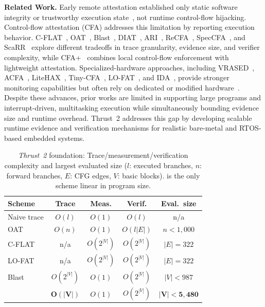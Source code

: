 \textbf{Related Work.}
Early remote attestation established only static software integrity or trustworthy execution state~\cite{seshadri2005pioneer,li2011viper,kong2014pufatt,armknecht2013security,eldefrawy2012smart}, not runtime control-flow hijacking.
Control-flow attestation (CFA) addresses this limitation by reporting execution behavior.
C-FLAT~\cite{abera2016c}, OAT~\cite{sun2020oat}, Blast~\cite{yadav2023whole}, DIAT~\cite{abera2019diat}, ARI~\cite{wangari}, ReCFA~\cite{zhang2021recfa}, SpecCFA~\cite{caulfield2024speccfa}, and ScaRR~\cite{toffalini2019scarr} explore different tradeoffs in trace granularity, evidence size, and verifier complexity, while CFA+~\cite{299850} combines local control-flow enforcement with lightweight attestation.
Specialized-hardware approaches, including VRASED~\cite{nunes2019vrased}, ACFA~\cite{caulfield2023acfa}, LiteHAX~\cite{dessouky2018litehax}, Tiny-CFA~\cite{nunes2021tiny}, LO-FAT~\cite{dessouky2017fat}, and IDA~\cite{arkannezhadida}, provide stronger monitoring capabilities but often rely on dedicated or modified hardware~\cite{neto2025pearts}.
Despite these advances, prior works are limited in supporting large programs and interrupt-driven, multitasking execution while simultaneously bounding evidence size and runtime overhead.
Thrust~2 addresses this gap by developing scalable runtime evidence and verification mechanisms for realistic bare-metal and RTOS-based embedded systems.

\begin{table}
	\centering
	\footnotesize
	\setlength{\tabcolsep}{3pt}
	\begin{tabular}{lcccc}
		\toprule
		Scheme & Trace & Meas. & Verif. & Eval.\ size \\
		\midrule
		Naive trace & $O(l)$ & $O(1)$ & $O(l)$ & n/a \\
		OAT~\cite{sun2020oat} & $O(n)$ & $O(1)$ & $O(l|E|)$ & $n{<}1{,}000$ \\
		C-FLAT~\cite{abera2016c} & n/a & $O(2^{|V|})$ & $O(2^{|V|})$ & $|E|{=}322$ \\
		LO-FAT~\cite{dessouky2017fat} & n/a & $O(2^{|V|})$ & $O(2^{|V|})$ & $|E|{=}322$ \\
		Blast~\cite{yadav2023whole} & $O(2^{|V|})$ & $O(1)$ & $O(2^{|V|})$ & $|V|{<}987$ \\
		\textbf{\enola}~\cite{armanuzzaman2026enola} & $\mathbf{O(|V|)}$ & $O(1)$ & $O(2^{|V|})$ & $\mathbf{|V|{<}5{,}480}$ \\
		\bottomrule
	\end{tabular}
	\caption{\textit{Thrust~2} foundation: Trace/measurement/verification complexity and largest evaluated size ($l$: executed branches, $n$: forward branches, $E$: CFG edges, $V$: basic blocks). \enola is the only scheme linear in program size.}
	\label{tab:enola}
	\vspace{-8pt}
\end{table}


